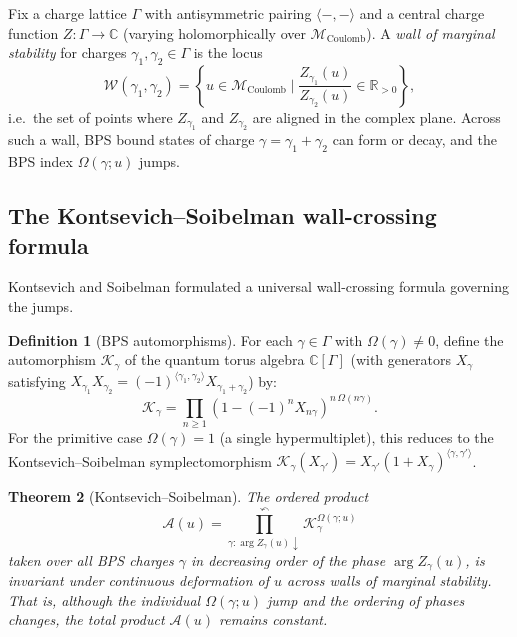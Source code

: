 \documentclass[11pt]{article}
\newtheorem{theorem}{Theorem}[section]
\theoremstyle{definition}
\newtheorem{definition}[theorem]{Definition}
\theoremstyle{remark}
\newcommand{\cM}{\mathcal{M}}
\newcommand{\cW}{\mathcal{W}}
\newcommand{\Coulomb}{\mathrm{Coulomb}}
\begin{document}
Fix a charge lattice $\Gamma$ with antisymmetric pairing $\langle -, - \rangle$ and a central
charge function $Z \colon \Gamma \to \mathbb{C}$ (varying holomorphically over $\cM_{\Coulomb}$).
A \emph{wall of marginal stability} for charges $\gamma_1, \gamma_2 \in \Gamma$ is the locus
\begin{equation}
 \label{eq:wall}
 \cW(\gamma_1, \gamma_2) = \left\{ u \in \cM_{\Coulomb} \;\Big|\; \frac{Z_{\gamma_1}(u)}{Z_{\gamma_2}(u)} \in \mathbb{R}_{>0} \right\},
\end{equation}
i.e.\ the set of points where $Z_{\gamma_1}$ and $Z_{\gamma_2}$ are aligned in the complex plane.
Across such a wall, BPS bound states of charge $\gamma = \gamma_1 + \gamma_2$ can form or decay,
and the BPS index $\Omega(\gamma; u)$ jumps.

\subsection{The Kontsevich--Soibelman wall-crossing formula}
\label{subsec:ks-formula}

Kontsevich and Soibelman formulated a universal wall-crossing formula governing the jumps.

\begin{definition}[BPS automorphisms]
 \label{def:bps-auto}
 For each $\gamma \in \Gamma$ with $\Omega(\gamma) \neq 0$, define the automorphism
 $\mathcal{K}_\gamma$ of the quantum torus algebra $\mathbb{C}[\Gamma]$ (with generators
 $X_\gamma$ satisfying $X_{\gamma_1} X_{\gamma_2} = (-1)^{\langle \gamma_1, \gamma_2 \rangle}
 X_{\gamma_1 + \gamma_2}$) by:
 \begin{equation}
 \label{eq:ks-automorphism}
 \mathcal{K}_\gamma = \prod_{n \geq 1} \left(1 - (-1)^n X_{n\gamma}\right)^{n \, \Omega(n\gamma)}.
 \end{equation}
 For the primitive case $\Omega(\gamma) = 1$ (a single hypermultiplet), this reduces to the
 Kontsevich--Soibelman symplectomorphism
 $\mathcal{K}_\gamma(X_{\gamma'}) = X_{\gamma'} (1 + X_\gamma)^{\langle \gamma, \gamma' \rangle}$.
\end{definition}

\begin{theorem}[Kontsevich--Soibelman]
 \label{thm:ks-wcf}
 The ordered product
 \begin{equation}
 \label{eq:ks-product}
 \mathcal{A}(u) = \prod_{\gamma : \arg Z_\gamma(u) \downarrow}^{\curvearrowleft} \mathcal{K}_\gamma^{\Omega(\gamma; u)}
 \end{equation}
 taken over all BPS charges $\gamma$ in decreasing order of the phase $\arg Z_\gamma(u)$, is
 \emph{invariant} under continuous deformation of $u$ across walls of marginal stability.
 That is, although the individual $\Omega(\gamma; u)$ jump and the ordering of phases changes,
 the total product $\mathcal{A}(u)$ remains constant.
\end{theorem}
\end{document}
